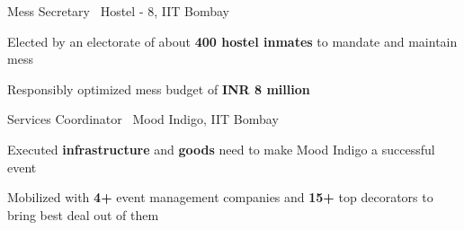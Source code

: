 \begin{cventries}
    \cventry
    {}
    {Mess Secretary \textbar \ Hostel - 8, IIT Bombay}
    {\color{darkgray}{(August'17 - April'18)}}
    {}
    {
      \begin{cvitems}
        \item{Elected by an electorate of about \textbf{400 hostel inmates} to mandate and maintain mess}
        \item{Responsibly optimized mess budget of \textbf{INR 8 million}} \vspace{-1mm}
      \end{cvitems}
    }
    \cventry
    {}
    {Services Coordinator \textbar \ Mood Indigo, IIT Bombay}
    {\color{darkgray}{(May’17 - January’18)}}
    {}
    {
      \begin{cvitems}
        \item{Executed \textbf{infrastructure} and \textbf{goods} need to make Mood Indigo a successful event}
        \item{Mobilized with \textbf{4+} event management companies and \textbf{15+} top decorators to bring best deal out of them} \vspace{-1mm}
      \end{cvitems}
    }
\end{cventries}
